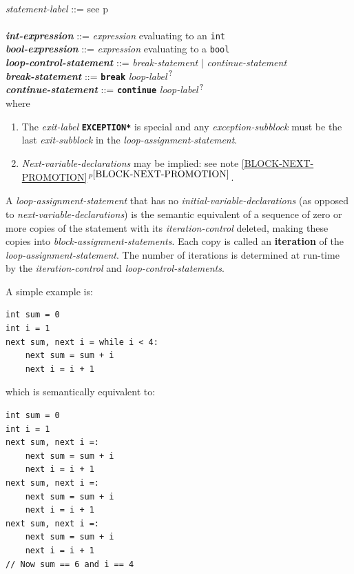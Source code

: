 \documentclass[12pt]{article}
\newcommand{\QMARK}{{$^{\,\mbox{\footnotesize ?}}$}}
\newcommand{\key}[1]{{\rm \bfseries #1}}
\newcommand{\ttkey}[1]{{\tt \bfseries #1}}
\newcommand{\emkey}[1]{{\em \bfseries #1}}
\newcommand{\pagref}[1]{p\pageref{#1}}
\newcommand{\pagnote}[1]{$\,^{p\pageref{#1}}$}
\newenvironment{indpar}[1][0.3in]%
	{\begin{list}{}%
		     {\setlength{\itemsep}{0in}%
		      \setlength{\topsep}{0in}%
		      \setlength{\parsep}{1ex}%
		      \setlength{\labelwidth}{#1}%
		      \setlength{\leftmargin}{#1}%
		      \addtolength{\leftmargin}{\labelsep}}%
	 \item}%
	{\end{list}}
\begin{document}
\begin{indpar}
\\[0.5ex]
{\em statement-label} ::= see \pagref{STATEMENT-LABEL} \\
\\[0.5ex]
\emkey{int-expression} ::= {\em expression} evaluating to an {\tt int}
\\[0.5ex]
\emkey{bool-expression}\label{BOOL-EXPRESSION} ::=
    {\em expression} evaluating to a {\tt bool}
\\[0.5ex]
\emkey{loop-control-statement}\label{LOOP-CONTROL-STATEMENT} ::=
    {\em break-statement} $|$ {\em continue-statement}
\\[0.5ex]
\emkey{break-statement}\label{BREAK-STATEMENT} ::=
    \ttkey{break} {\em loop-label}\QMARK{}
\\[0.5ex]
\emkey{continue-statement}\label{CONTINUE-STATEMENT} ::=
    \ttkey{continue} {\em loop-label}\QMARK{}
\\[2.0ex]
where
\begin{enumerate}

\item The {\em exit-label} \ttkey{*EXCEPTION*} is special and
any {\em exception-subblock} must be the last {\em exit-subblock}
in the {\em loop-assignment-statement}.

\item {\em Next-variable-declarations} may be implied: see
note \ref{BLOCK-NEXT-PROMOTION}\pagnote{BLOCK-NEXT-PROMOTION}.


\end{enumerate}
\end{indpar}

A {\em loop-assignment-statement} that has
no {\em initial-variable-declarations}
(as opposed to {\em next-variable-declarations})
is the semantic equivalent of
a sequence of zero or more copies of the statement with
its {\em iteration-control} deleted, making these copies into
{\em block-assignment-statements}.  Each copy is called an
\key{iteration} of the {\em loop-assignment-statement}.
The number of iterations is
determined at run-time by the {\em iteration-control}
and {\em loop-control-statements}.

A simple example is:
\begin{indpar}\begin{verbatim}
int sum = 0
int i = 1
next sum, next i = while i < 4:
    next sum = sum + i
    next i = i + 1
\end{verbatim}\end{indpar}
which is semantically equivalent to:
\begin{indpar}\begin{verbatim}
int sum = 0
int i = 1
next sum, next i =:
    next sum = sum + i
    next i = i + 1
next sum, next i =:
    next sum = sum + i
    next i = i + 1
next sum, next i =:
    next sum = sum + i
    next i = i + 1
// Now sum == 6 and i == 4
\end{verbatim}\end{indpar}
\end{document}
